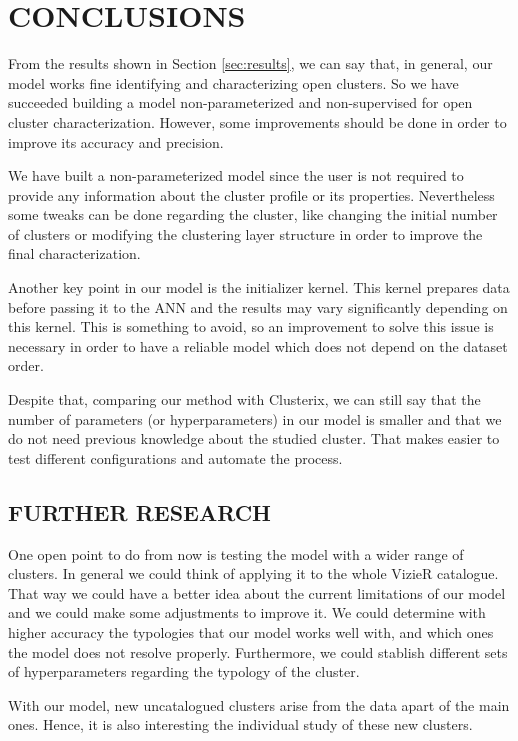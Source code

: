 \documentclass[11pt,a4paper,english,twocolumn]{article}
\begin{document}
\section{CONCLUSIONS}

From the results shown in Section \ref{sec:results}, we can say that, in general,
our model works fine identifying and characterizing open clusters.
So we have succeeded building a model non-parameterized and non-supervised
for open cluster characterization. However, some improvements should be done
in order to improve its accuracy and precision.

We have built a non-parameterized model since the user is not required to provide
any information about the cluster profile or its properties.
Nevertheless some tweaks can be done regarding the cluster, like changing the initial
number of clusters or modifying the clustering layer structure in order to improve
the final characterization.

Another key point in our model is the initializer kernel.
This kernel prepares data before passing it to the ANN
and the results may vary significantly depending on this kernel.
This is something to avoid, so an improvement to solve this issue is necessary
in order to have a reliable model which does not depend on the dataset order.

Despite that, comparing our method with Clusterix, we can still say that the
number of parameters (or hyperparameters) in our model is smaller and that
we do not need previous knowledge about the studied cluster.
That makes easier to test different configurations and automate the process.

\subsection{FURTHER RESEARCH}

One open point to do from now is testing the model with a wider range of clusters.
In general we could think of applying it to the whole VizieR catalogue.
That way we could have a better idea about the current limitations of our model
and we could make some adjustments to improve it. We could determine with higher
accuracy the typologies that our model works well with, and which ones the model
does not resolve properly. Furthermore, we could stablish different sets of
hyperparameters regarding the typology of the cluster.

With our model, new uncatalogued clusters arise from the data apart of the main ones.
Hence, it is also interesting the individual study of these new clusters.
\end{document}
